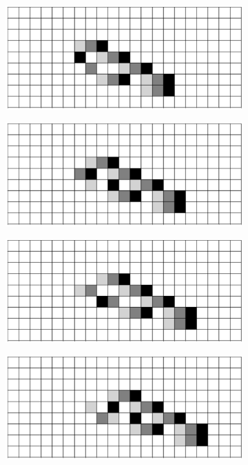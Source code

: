 \documentclass[12pt]{article}
\numberwithin{figure}{section} %
\begin{document}
\begin{figure}[H]
\begin{subfigure}{0.45\textwidth}
     	\includegraphics[width=\linewidth]{Section4/35.6}
     	\subcaption{}
   	\end{subfigure}
    	\begin{subfigure}{0.45\textwidth}
     	\includegraphics[width=\linewidth]{Section4/35.7}
     	\subcaption{}
   	\end{subfigure}
	\newline
	\begin{subfigure}{0.45\textwidth}
     	\includegraphics[width=\linewidth]{Section4/35.8}
     	\subcaption{}
   	\end{subfigure}
    	\begin{subfigure}{0.45\textwidth}
     	\includegraphics[width=\linewidth]{Section4/35.9}

\end{subfigure}
\end{figure}
\end{document}
